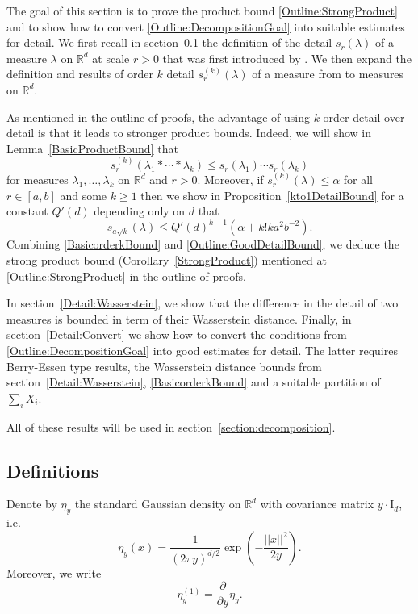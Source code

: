 \documentclass[10pt, english,oneside,reqno]{amsart}
\theoremstyle{plain}
\theoremstyle{remark}
\numberwithin{equation}{section}
\numberwithin{figure}{section}
\newcommand{\R}{\mathbb{R}}
\begin{document}
The goal of this section is to prove the product bound \eqref{Outline:StrongProduct} and to show how to convert \eqref{Outline:DecompositionGoal} into suitable estimates for detail. We first recall in section~\ref{Detail:Definition} the definition of the detail $s_r(\lambda)$ of a measure $\lambda$ on $\R^d$ at scale $r > 0$ that was first introduced by \cite{Kittle2021}.  We then expand the definition and results of order $k$ detail $s_r^{(k)}(\lambda)$ of a measure from \cite{Kittle2023} to measures on $\R^d$.

As mentioned in the outline of proofs, the advantage of using $k$-order detail over detail is that it leads to stronger product bounds. Indeed, we will show in Lemma~\ref{BasicProductBound} that 
\begin{equation}\label{BasicorderkBound}
    s_r^{(k)}(\lambda_1 * \cdots * \lambda_k) \leq s_r(\lambda_1)\cdots s_r(\lambda_k)
\end{equation}
for measures $\lambda_1, \ldots , \lambda_k$ on $\R^d$ and $r > 0$. Moreover, if $s_{r}^{(k)}(\lambda) \leq \alpha$ for all $r \in [a,b]$ and some $k \geq 1$ then we show in Proposition~\ref{kto1DetailBound} for a constant $Q'(d)$ depending only on $d$ that 
\begin{equation}\label{Outline:GoodDetailBound}
    s_{a\sqrt{k}}(\lambda) \leq Q'(d)^{k-1}(\alpha + k! ka^2b^{-2}).
\end{equation} Combining \eqref{BasicorderkBound} and \eqref{Outline:GoodDetailBound}, we deduce the strong product bound (Corollary~\ref{StrongProduct}) mentioned at \eqref{Outline:StrongProduct} in the outline of proofs. 

In section~\ref{Detail:Wasserstein}, we show that the difference in the detail of two measures is bounded in term of their Wasserstein distance. Finally, in section~\ref{Detail:Convert} we show how to convert the conditions from \eqref{Outline:DecompositionGoal} into good estimates for detail. The latter requires Berry-Essen type results, the Wasserstein distance bounds from section~\ref{Detail:Wasserstein},  \eqref{BasicorderkBound} and a suitable partition of $\sum_i X_i$.

All of these results will be used in section~\ref{section:decomposition}.

\subsection{Definitions}\label{Detail:Definition}

Denote by $\eta_y$ the standard Gaussian density on $\R^d$ with covariance matrix $y \cdot \mathrm{I}_d$, i.e. $$\eta_y(x) = \frac{1}{(2\pi y)^{d/2}} \exp\left( - \frac{||x||^2}{2y} \right).$$ Moreover, we write $$\eta_y^{(1)} = \frac{\partial}{\partial y} \eta_y.$$
\end{document}
